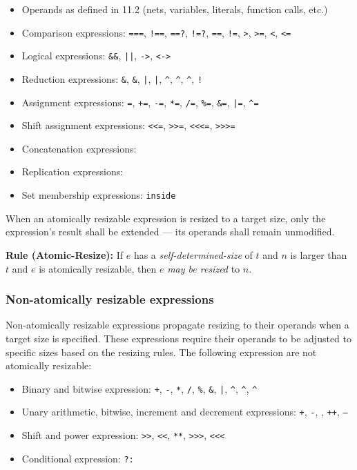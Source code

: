 \documentclass{article}
\newcommand{\tild}{\raisebox{-.7ex}{\textasciitilde{}}}
\newcommand{\sds}{\emph{self-determined-size}}
\newcommand{\mbr}{\emph{may be resized}}
\newenvironment{typingrule}[1]%
{\par\noindent\textbf{Rule (#1):} }%
{\par}
\newcommand{\binOp}{\texttt{+}, \texttt{-}, \texttt{*}, \texttt{/}, \texttt{\%},
\texttt{\&}, \texttt{|}, \texttt{\^{}}, \texttt{\^{}\tild},
\texttt{\tild\^{}}}
\newcommand{\unOp}{\texttt{+}, \texttt{-}, \texttt{\tild}, \texttt{++},
  \texttt{--}}
\newcommand{\shiftOp}{\texttt{>>}, \texttt{<}\texttt{<}, \texttt{**},
  \texttt{>>>}, \texttt{<}\texttt{<}\texttt{<}}
\newcommand{\compOp}{\texttt{===}, \texttt{!==}, \texttt{==?}, \texttt{!=?},
  \texttt{==}, \texttt{!=}, \texttt{>}, \texttt{>=}, \texttt{<}, \texttt{<=}}
\newcommand{\logicOp}{\texttt{\&\&}, \texttt{||}, \texttt{->}, \texttt{<->}}
\newcommand{\redOp}{\texttt{\&}, \texttt{\tild\&}, \texttt{|}, \texttt{\tild|},
\texttt{\^{}}, \texttt{\tild\^{}}, \texttt{\^{}\tild}, \texttt{!}}
\newcommand{\assignOp}{\texttt{=}, \texttt{+=}, \texttt{-=}, \texttt{*=},
\texttt{/=}, \texttt{\%=}, \texttt{\&=}, \texttt{|=}, \texttt{\^{}=}}
\newcommand{\shiftAssignOp}{\texttt{<}\texttt{<}\texttt{=}, \texttt{>>=},
  \texttt{<}\texttt{<}\texttt{<=}, \texttt{>>>=}}
\begin{document}
\begin{itemize}
  \item Operands as defined in 11.2 (nets, variables, literals, function
    calls, etc.)
  \item Comparison expressions: \compOp{}
  \item Logical expressions: \logicOp{}
  \item Reduction expressions: \redOp{}
  \item Assignment expressions: \assignOp{}
  \item Shift assignment expressions: \shiftAssignOp
  \item Concatenation expressions: \texttt{\string{\dots\string}}
  \item Replication expressions: \texttt{}
  \item Set membership expressions: \texttt{inside}
\end{itemize}

When an atomically resizable expression is resized to a
target size, only the expression's result shall be extended --- its operands
shall remain unmodified.

\begin{typingrule}{Atomic-Resize}
  If $e$ has a \sds{} of $t$ and $n$ is larger than $t$
  and $e$ is atomically resizable, then $e$ \mbr{} to $n$.
\end{typingrule}

\subsubsection{Non-atomically resizable expressions}%

Non-atomically resizable expressions propagate resizing to their operands when
a target size is specified. These expressions require their operands to be
adjusted to specific sizes based on the resizing rules. The following expression
are not atomically resizable:

\begin{itemize}
  \item Binary and bitwise expression: \binOp{}
  \item Unary arithmetic, bitwise, increment and decrement expressions:
    \unOp{}
  \item Shift and power expression: \shiftOp{}
  \item Conditional expression: \texttt{?:}
\end{itemize}
\end{document}
